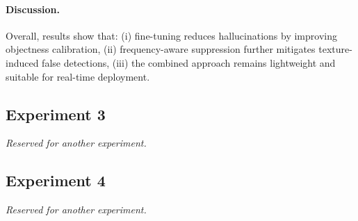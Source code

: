 \paragraph{Discussion.}
Overall, results show that:
(i) fine-tuning reduces hallucinations by improving objectness calibration,
(ii) frequency-aware suppression further mitigates texture-induced false detections,
(iii) the combined approach remains lightweight and suitable for real-time deployment.

\subsection{Experiment 3}

\textit{Reserved for another experiment.}

\subsection{Experiment 4}

\textit{Reserved for another experiment.}